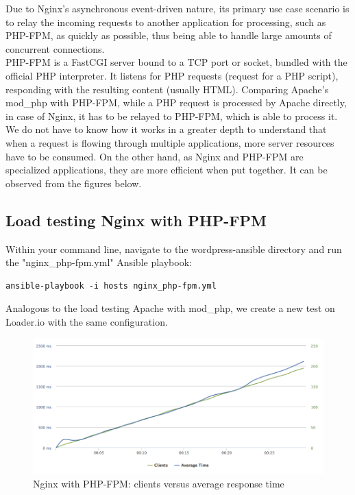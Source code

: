 Due to Nginx's asynchronous event-driven nature, its primary use case scenario is to relay the incoming requests to another application for processing, such as PHP-FPM, as quickly as possible, thus being able to handle large amounts of concurrent connections. \\

PHP-FPM is a FastCGI server bound to a TCP port or socket, bundled with the official PHP interpreter. It listens for PHP requests (request for a PHP script), responding with the resulting content (usually HTML). Comparing Apache's mod\_php with PHP-FPM, while a PHP request is processed by Apache directly, in case of Nginx, it has to be relayed to PHP-FPM, which is able to process it. We do not have to know how it works in a greater depth to understand that when a request is flowing through multiple applications, more server resources have to be consumed. On the other hand, as Nginx and PHP-FPM are specialized applications, they are more efficient when put together. It can be observed from the figures below.

\subsection{Load testing Nginx with PHP-FPM}

Within your command line, navigate to the wordpress-ansible directory and run the "nginx\_php-fpm.yml" Ansible playbook:

\begin{lstlisting}
ansible-playbook -i hosts nginx_php-fpm.yml
\end{lstlisting}

Analogous to the load testing Apache with mod\_php, we create a new test on Loader.io with the same configuration. \cite{Loader.io:nginx_php-fpm}

\begin{figure}[H]
\begin{center}
\includegraphics[scale=0.5]{figures/Nginx_PHP-FPM.png}
\caption{Nginx with PHP-FPM: clients versus average response time}
\label{fig:nginx_php-fpm}
\end{center}
\end{figure}

